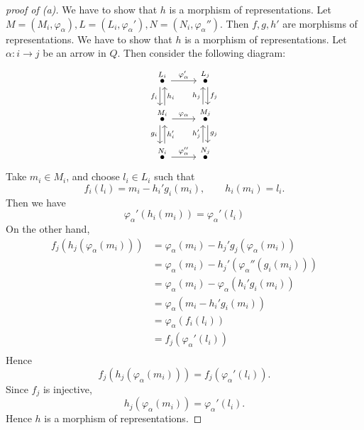 \documentclass[11pt, a4paper]{report}
\begin{document}
\begin{proof}[proof of (a)]
    We have to show that $h$ is a morphism of representations. Let $M=(M_i,\varphi_\alpha), L=(L_i,\varphi_\alpha'), N=(N_i, \varphi_\alpha'')$. Then $f,g,h'$ are morphisms of representations. We have to show that $h$ is a morphism of representations. Let $\alpha: i \to j$ be an arrow in $Q$. Then consider the following diagram:
    \[
        \begin{tikzcd}
            \overset{L_i}{\bullet} \arrow[d, "f_i"', shift right] \arrow[r, "\varphi_{\alpha}'"]                               & \overset{L_j}{\bullet} \arrow[d, "f_j", shift left]                              \\
            \overset{M_i}{\bullet} \arrow[d, "g_i"', shift right] \arrow[r, "\varphi_{\alpha}"] \arrow[u, "h_i"', shift right] & \overset{M_j}{\bullet} \arrow[d, "g_j", shift left] \arrow[u, "h_j", shift left] \\
            \overset{N_i}{\bullet} \arrow[r, "\varphi_{\alpha}''"] \arrow[u, "h_i'"', shift right]                             & \overset{N_j}{\bullet} \arrow[u, "h_j'", shift left]
        \end{tikzcd}
    \]
    Take $m_i \in M_i$, and choose $l_i \in L_i$ such that
    \[
        f_i(l_i)=m_i-h_i'g_i(m_i), \qquad h_i(m_i)=l_i.
    \]
    Then we have
    \[
        \varphi_\alpha' (h_i(m_i))=\varphi_\alpha' (l_i)
    \]
    On the other hand,
    \begin{align*}
        f_j(h_j(\varphi_\alpha(m_i))) & = \varphi_\alpha(m_i)-h_j' g_j(\varphi_\alpha(m_i))     \\
                                      & =\varphi_\alpha(m_i)- h_j' (\varphi_\alpha''(g_i(m_i))) \\
                                      & = \varphi_\alpha(m_i)- \varphi_\alpha(h_i ' g_i(m_i))   \\
                                      & = \varphi_\alpha(m_i-h_i ' g_i(m_i))                    \\
                                      & = \varphi_\alpha(f_i(l_i))                              \\
                                      & = f_j (\varphi_\alpha' (l_i))                           \\
    \end{align*}
    Hence
    \[
        f_j(h_j(\varphi_\alpha(m_i)))=f_j(\varphi_\alpha' (l_i)).
    \]
    Since $f_j$ is injective,
    \[
        h_j(\varphi_\alpha(m_i))=\varphi_\alpha' (l_i).
    \]
    Hence $h$ is a morphism of representations.
\end{proof}
\end{document}

